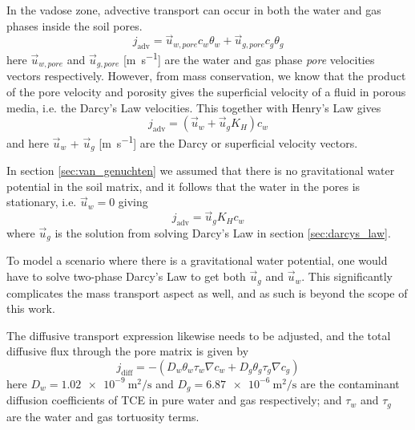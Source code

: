 In the vadose zone, advective transport can occur in both the water and gas phases inside the soil pores.
\begin{equation}
  j_\mathrm{adv} = \vec{u}_{w,pore} c_w \theta_w + \vec{u}_{g,pore} c_g \theta_g
\end{equation}
here $\vec{u}_{w,pore}$ and $\vec{u}_{g,pore}$ [\si{\metre\per\second}] are the water and gas phase \textit{pore} velocities vectors respectively.
However, from mass conservation, we know that the product of the pore velocity and porosity gives the superficial velocity of a fluid in porous media, i.e. the Darcy's Law velocities.
This together with Henry's Law gives
\begin{equation}
  j_\mathrm{adv} = (\vec{u}_w + \vec{u}_g K_H ) c_w
\end{equation}
and here $\vec{u}_w$ + $\vec{u}_g$ [\si{\metre\per\second}] are the Darcy or superficial velocity vectors.\par

In section \ref{sec:van_genuchten} we assumed that there is no gravitational water potential in the soil matrix, and it follows that the water in the pores is stationary, i.e. $\vec{u}_w = 0$ giving
\begin{equation}
  j_\mathrm{adv} = \vec{u}_g K_H c_w
\end{equation}
where $\vec{u}_g$ is the solution from solving Darcy's Law in section \ref{sec:darcys_law}.\par

To model a scenario where there is a gravitational water potential, one would have to solve two-phase Darcy's Law to get both $\vec{u}_g$ and $\vec{u}_w$.
This significantly complicates the mass transport aspect as well, and as such is beyond the scope of this work.\par

The diffusive transport expression likewise needs to be adjusted, and the total diffusive flux through the pore matrix is given by
\begin{equation}
  j_\mathrm{diff} = -(D_w \theta_w \tau_w \nabla c_w + D_g \theta_g \tau_g \nabla c_g)
\end{equation}
here $D_w = \SI{1.02e-9}{\metre\squared\per\second}$ and $D_g = \SI{6.87e-6}{\metre\squared\per\second}$ are the contaminant diffusion coefficients of TCE in pure water and gas respectively; %
and $\tau_w$ and $\tau_g$ are the water and gas tortuosity terms.\par

